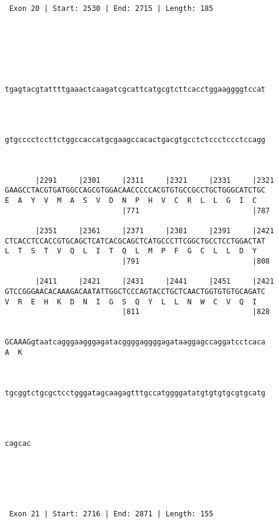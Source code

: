 \documentclass{article}
\begin{document}
\begin{Verbatim}
  



 Exon 20 | Start: 2530 | End: 2715 | Length: 185 





   
                                                            
tgagtacgtattttgaaactcaagatcgcattcatgcgtcttcacctggaaggggtccat
                                                            

   
                                                            
gtgcccctccttctggccaccatgcgaagccacactgacgtgcctctccctccctccagg
                                                            

   
       |2291     |2301     |2311     |2321     |2331     |2321
GAAGCCTACGTGATGGCCAGCGTGGACAACCCCCACGTGTGCCGCCTGCTGGGCATCTGC
E  A  Y  V  M  A  S  V  D  N  P  H  V  C  R  L  L  G  I  C  
                           |771                          |787
   
       |2351     |2361     |2371     |2381     |2391     |2421
CTCACCTCCACCGTGCAGCTCATCACGCAGCTCATGCCCTTCGGCTGCCTCCTGGACTAT
L  T  S  T  V  Q  L  I  T  Q  L  M  P  F  G  C  L  L  D  Y  
                           |791                          |808
   
       |2411     |2421     |2431     |2441     |2451     |2421
GTCCGGGAACACAAAGACAATATTGGCTCCCAGTACCTGCTCAACTGGTGTGTGCAGATC
V  R  E  H  K  D  N  I  G  S  Q  Y  L  L  N  W  C  V  Q  I  
                           |811                          |828
   
                                                            
GCAAAGgtaatcagggaagggagatacggggaggggagataaggagccaggatcctcaca
A  K                                                        
                                                            
   
                                                            
tgcggtctgcgctcctgggatagcaagagtttgccatggggatatgtgtgtgcgtgcatg
                                                            
                                                            
   
      
cagcac
      
      
  



 Exon 21 | Start: 2716 | End: 2871 | Length: 155 






\end{Verbatim}
\end{document}

